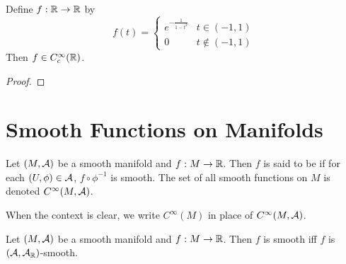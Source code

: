 \documentclass{book}
\begin{document}
\begin{ex}
	Define $f:\mathbb{R} \rightarrow \mathbb{R}$ by 
	\[
	f(t) = 
	\begin{cases}
		e^{-\frac{1}{1-t^2}} & t \in (-1,1)\\
		0 &  t \not \in (-1,1)
	\end{cases}
	\]
	Then $f \in C_c^{\infty}(\mathbb{R})$.
\end{ex}

\begin{proof}
	
\end{proof}




































\newpage
\section{Smooth Functions on Manifolds}	

\begin{defn} 
	Let $(M, \mathcal{A})$ be a smooth manifold and $f: M \rightarrow \mathbb{R}$. Then $f$ is said to be  if for each $(U, \phi) \in \mathcal{A}$, $f \circ \phi^{-1}$ is smooth. The set of all smooth functions on $M$ is denoted $C^{\infty}(M, \mathcal{A})$.
\end{defn}

\begin{note}
	When the context is clear, we write $C^{\infty}(M)$ in place of $C^{\infty}(M, \mathcal{A})$.
\end{note}

\begin{ex}
	Let $(M, \mathcal{A})$ be a smooth manifold and $f: M \rightarrow \mathbb{R}$. Then $f$ is smooth iff $f$ is $(\mathcal{A}, \mathcal{A}_{\mathbb{R}})$-smooth.
\end{ex}
\end{document}
